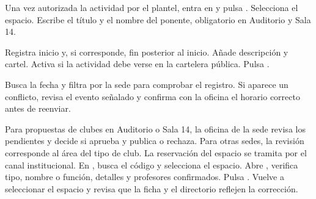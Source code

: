 \begin{pasos}
\item Una vez autorizada la actividad por el plantel, entra en  y pulsa . Selecciona el espacio. Escribe el título y el nombre del ponente, obligatorio en Auditorio y Sala 14.
\item Registra inicio y, si corresponde, fin posterior al inicio. Añade descripción y cartel. Activa  si la actividad debe verse en la cartelera pública. Pulsa .
\item Busca la fecha y filtra por la sede para comprobar el registro. Si aparece un conflicto, revisa el evento señalado y confirma con la oficina el horario correcto antes de reenviar.
\end{pasos}
Para propuestas de clubes en Auditorio o Sala 14, la oficina de la sede revisa los pendientes y decide si aprueba y publica o rechaza. Para otras sedes, la revisión corresponde al área del tipo de club. La reservación del espacio se tramita por el canal institucional.
En , busca el código y selecciona el espacio. Abre , verifica tipo, nombre o función, detalles y profesores confirmados. Pulsa . Vuelve a seleccionar el espacio y revisa que la ficha y el directorio reflejen la corrección.

